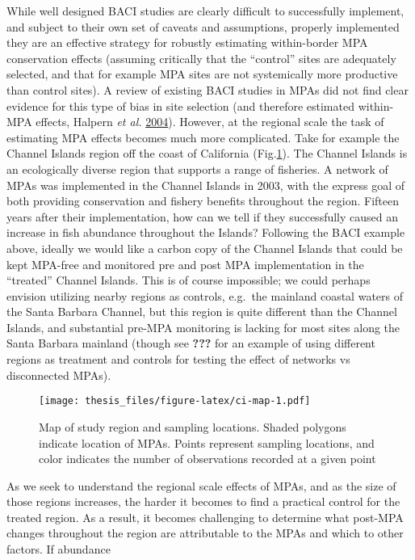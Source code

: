 \documentclass[twoside,12pt,final]{ucthesis-CA2012}
\begin{document}
\begin{ucmainmatter}
While well designed BACI studies are clearly difficult to successfully
implement, and subject to their own set of caveats and assumptions,
properly implemented they are an effective strategy for robustly
estimating within-border MPA conservation effects (assuming critically
that the ``control'' sites are adequately selected, and that for example
MPA sites are not systemically more productive than control sites). A
review of existing BACI studies in MPAs did not find clear evidence for
this type of bias in site selection (and therefore estimated within-MPA
effects, Halpern \emph{et al.}
\protect\hyperlink{ref-Halpern2004}{2004}). However, at the regional
scale the task of estimating MPA effects becomes much more complicated.
Take for example the Channel Islands region off the coast of California
(Fig.\ref{fig:ci-map}). The Channel Islands is an ecologically diverse
region that supports a range of fisheries. A network of MPAs was
implemented in the Channel Islands in 2003, with the express goal of
both providing conservation and fishery benefits throughout the region.
Fifteen years after their implementation, how can we tell if they
successfully caused an increase in fish abundance throughout the
Islands? Following the BACI example above, ideally we would like a
carbon copy of the Channel Islands that could be kept MPA-free and
monitored pre and post MPA implementation in the ``treated'' Channel
Islands. This is of course impossible; we could perhaps envision
utilizing nearby regions as controls, e.g.~the mainland coastal waters
of the Santa Barbara Channel, but this region is quite different than
the Channel Islands, and substantial pre-MPA monitoring is lacking for
most sites along the Santa Barbara mainland (though see {\textbf{???}}
for an example of using different regions as treatment and controls for
testing the effect of networks vs disconnected MPAs).
\begin{figure}
\centering
\texttt{[image: thesis\_files/figure-latex/ci-map-1.pdf]}
\caption{\label{fig:ci-map}Map of study region and sampling locations.
Shaded polygons indicate location of MPAs. Points represent sampling
locations, and color indicates the number of observations recorded at a
given point}
\end{figure}
As we seek to understand the regional scale effects of MPAs, and as the
size of those regions increases, the harder it becomes to find a
practical control for the treated region. As a result, it becomes
challenging to determine what post-MPA changes throughout the region are
attributable to the MPAs and which to other factors. If abundance

\end{ucmainmatter}
\end{document}
